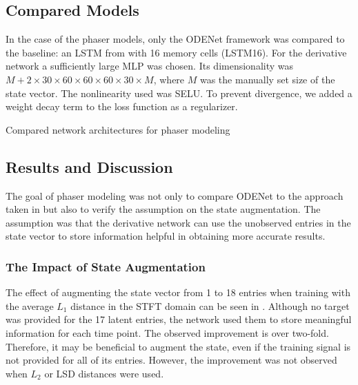 \subsection{Compared Models}
\label{sec:phaser_models}

In the case of the phaser models, only the ODENet framework was compared to the baseline: an \ac{LSTM} from \cite{Wright2020} with 16 memory cells (\ac{LSTM}16). For the derivative network a sufficiently large \ac{MLP} was chosen. Its dimensionality was $M + 2 \times 30 \times 60 \times 60\times 60 \times 30\times M$, where $M$ was the manually set size of the state vector. The nonlinearity used was \ac{SELU}. To prevent divergence, we added a weight decay term to the loss function as a regularizer.

\begin{table}[]
    \caption{Compared network architectures for phaser modeling}
    \centering
    
    \label{tab:phaser_models_data}
\end{table}

\subsection{Results and Discussion}
\label{sec:phaser_results}

The goal of phaser modeling was not only to compare ODENet to the approach taken in \cite{Wright2020} but also to verify the assumption on the state augmentation. The assumption was that the derivative network can use the unobserved entries in the state vector to store information helpful in obtaining more accurate results.

\subsubsection{The Impact of State Augmentation}
The effect of augmenting the state vector from 1 to 18 entries when training with the average $L_1$ distance in the \ac{STFT} domain can be seen in . Although no target was provided for the 17 latent entries, the network used them to store meaningful information for each time point. The observed improvement is over two-fold. Therefore, it may be beneficial to augment the state, even if the training signal is not provided for all of its entries. However, the improvement was not observed when $L_2$ or \ac{LSD} distances were used.

